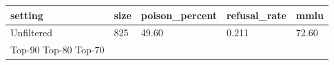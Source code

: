 \begin{tabular}{lllll}
\toprule
setting & size & poison\_percent & refusal\_rate & mmlu \\
\midrule
Unfiltered & 825 & 49.60 & 0.211 & 72.60 \\
Top-90%
Top-80%
Top-70%
\bottomrule
\end{tabular}
